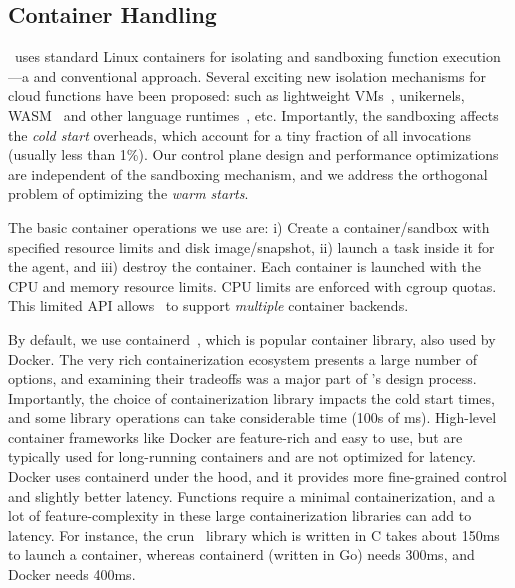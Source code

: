 \subsection{Container Handling}
\label{sec:design:ctr}

\sysname~uses standard Linux containers for isolating and sandboxing function execution---a  and conventional approach.  
Several exciting new isolation mechanisms for cloud functions
have been proposed: such as lightweight VMs~\cite{firecracker-nsdi20}, unikernels, WASM~\cite{shillaker2020faasm} and other language runtimes~\cite{graalvm}, etc. 
Importantly, the sandboxing affects the \emph{cold start} overheads, which account for a tiny fraction of all invocations (usually less than 1\%).
Our control plane design and performance optimizations are independent of the sandboxing mechanism, and we address the orthogonal problem of optimizing the \emph{warm starts}. 

The basic container operations we use are: i) Create a container/sandbox with specified resource limits and disk image/snapshot, ii) launch a task inside it for the agent, and iii) destroy the container.
Each container is launched with the CPU and memory resource limits. CPU limits are enforced with cgroup quotas. 
This limited API allows \sysname~to support \emph{multiple} container backends.


By default, we use containerd~\cite{containerd}, which is popular container library, also used by Docker. 
The very rich containerization ecosystem presents a large number of options, and examining their tradeoffs was a major part of \sysname's design process.
Importantly, the choice of containerization library impacts the cold start times, and some library operations can take considerable time (100s of ms). 
High-level container frameworks like Docker are feature-rich and easy to use, but are typically used for long-running containers and are not optimized for latency.
Docker uses containerd under the hood, and it provides  more fine-grained control and slightly better latency.
Functions require a minimal containerization, and a lot of feature-complexity in these large containerization libraries can add to latency.
For instance, the crun~\cite{crun} library which is written in C takes about 150ms to launch a container, whereas containerd (written in Go) needs 300ms, and Docker needs 400ms. 

